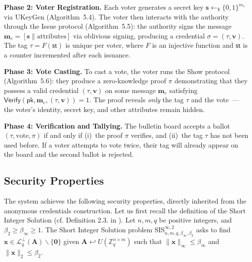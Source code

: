 \documentclass[a4paper]{article}
\newcommand{\pk}{\mathsf{pk}}
\newcommand{\sig}{\sigma}
\newcommand{\sample}{\leftarrow_\$}
\begin{document}
\textbf{Phase 2: Voter Registration.} Each voter generates a secret key $\mathbf{s} \sample \{0,1\}^{m_s}$ via \textsf{UKeyGen} (Algorithm~5.4). The voter then interacts with the authority through the \textsf{Issue} protocol (Algorithm~5.5): the authority signs the message $\mathbf{m}_e = [\mathbf{s} \| \text{attributes}]$ via oblivious signing, producing a credential $\sig = (\tau, \mathbf{v})$. The tag $\tau = F(\textsf{st})$ is unique per voter, where $F$ is an injective function and $\textsf{st}$ is a counter incremented after each issuance.

\textbf{Phase 3: Vote Casting.} To cast a vote, the voter runs the \textsf{Show} protocol (Algorithm~5.6): they produce a zero-knowledge proof $\pi$ demonstrating that they possess a valid credential $(\tau, \mathbf{v})$ on some message $\mathbf{m}_e$ satisfying $\textsf{Verify}(\pk, \mathbf{m}_e, (\tau, \mathbf{v})) = 1$. The proof reveals \emph{only} the tag $\tau$ and the vote~--- the voter's identity, secret key, and other attributes remain hidden.

\textbf{Phase 4: Verification and Tallying.} The bulletin board accepts a ballot $(\tau, \text{vote}, \pi)$ if and only if (i)~the proof $\pi$ verifies, and (ii)~the tag $\tau$ has not been used before. If a voter attempts to vote twice, their tag will already appear on the board and the second ballot is rejected.


\subsection{Security Properties}

The system achieves the following security properties, directly inherited from the anonymous credentials construction. Let us first recall the definition of the Short Integer Solution (cf. Definition 2.3. in \cite{mainPaper}). Let $n, m, q$ be positive integers, and 
$\beta_2 \geq \beta_\infty \geq 1$. The Short Integer Solution problem $\text{SIS}_{n, m, q, \beta_\infty, \beta_2}^{\infty,2}$ asks to find $\mathbf{x} \in \mathcal{L}_q^\perp (\mathbf{A}) \backslash \{\mathbf{0}\}$ given 
$\mathbf{A} \hookleftarrow U(\mathbb{Z}_q^{n\times m})$ such that $\lVert \mathbf{x} \rVert_\infty \leq \beta_\infty$ and $\lVert \mathbf{x} \rVert_2 \leq \beta_2$. 
\end{document}
